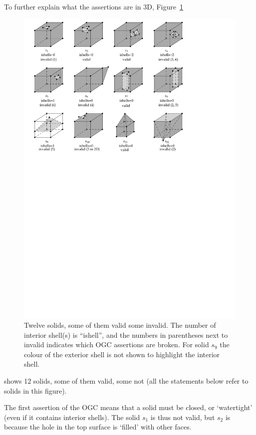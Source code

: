 To further explain what the assertions are in 3D, Figure~\ref{fig:validornot}
\begin{figure}
  \centering
  \includegraphics[width=\textwidth]{figs/validornot.pdf}
  \caption{Twelve solids, some of them valid some invalid. The number of interior shell(s) is ``ishell'', and the numbers in parentheses next to invalid indicates which OGC assertions are broken. For solid $s_9$ the colour of the exterior shell is not shown to highlight the interior shell.}%
\label{fig:validornot}
\end{figure}
shows 12 solids, some of them valid, some not (all the statements below refer to solids in this figure).

The first assertion of the OGC means that a solid must be closed, or `watertight' (even if it contains interior shells).
The solid $s_1$ is thus not valid, but $s_2$ is because the hole in the top surface is `filled' with other faces.

